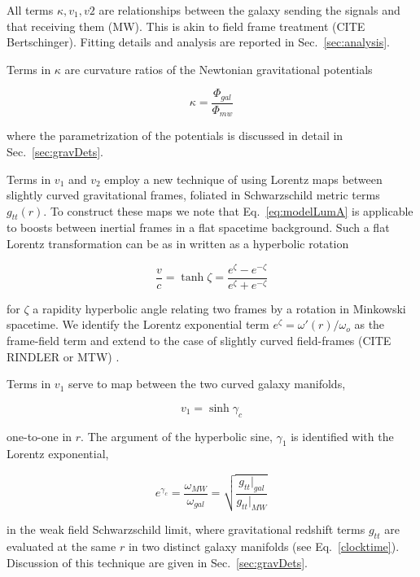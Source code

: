 \documentclass[reprint,%
 amsmath,amssymb,
 aps,
]{revtex4-1}
\begin{document}
 All terms $\kappa, v_1, v2$ are relationships between 
  the galaxy sending the signals  and that receiving them (MW). This is akin to field frame treatment (CITE Bertschinger).  Fitting details and analysis are reported in Sec.~\ref{sec:analysis}. 

 Terms in $\kappa$ 
are 
curvature ratios of the Newtonian gravitational potentials  

 \begin{equation}
\kappa=\frac{\Phi_{gal}}{\Phi_{mw}}  
\label{eq:kappa2}  
\end{equation}  
 
where the parametrization of the potentials is discussed in detail in Sec.~\ref{sec:gravDets}.
 

Terms in $v_1$ and $v_2$   employ a new technique of using Lorentz maps between slightly curved gravitational frames, foliated in Schwarzschild metric terms $g_{tt}(r)$. To construct these maps we note that 
  Eq.~\ref{eq:modelLumA}   is applicable to boosts between   inertial frames in a flat spacetime background.   Such a flat Lorentz transformation   can be  as in   written as a hyperbolic rotation  
  
     \begin{equation}
         \frac{v}{c} = \tanh \zeta = \frac{e^\zeta - e^{-\zeta}}{e^\zeta + e^{-\zeta}}   
         \label{boost}
     \end{equation} 

 for $\zeta$ a rapidity hyperbolic angle  relating two frames by  a rotation in Minkowski spacetime. We identify the 
    Lorentz exponential term  $e^\zeta = \omega'(r) /\omega_o$ as the frame-field term  and extend to the case of slightly curved field-frames (CITE RINDLER or MTW) . 
    
     
Terms in $v_1$   serve to   map between the two curved galaxy manifolds, 
 
   \begin{equation}
       v_1 = \sinh \gamma_c
   \end{equation}
 
 one-to-one in $r$. 
 The argument of the hyperbolic sine, $\gamma_1$ is identified with the Lorentz exponential, 
 
     \begin{equation}
     e^{\gamma_c}=  \frac{\omega_{MW}}{\omega_{gal}}  =\sqrt{\frac{g_{tt}|_{gal}}{g_{tt}|_{MW}}}  
      \label{eq:gravRS}
    \end{equation}
    
in the  weak field Schwarzschild  limit, where gravitational  redshift terms $g_{tt}$ are evaluated at the same $r$ in   two distinct galaxy manifolds (see Eq.~\ref{clocktime}). Discussion of this technique are given in Sec.~\ref{sec:gravDets}. 
  
\end{document}
